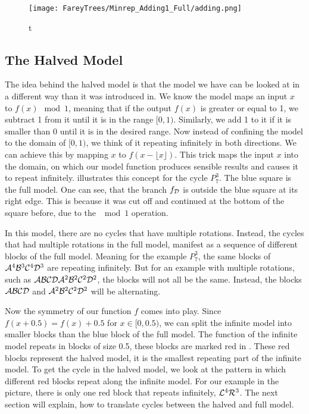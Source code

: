\begin{figure}
	\centering
	\texttt{[image: FareyTrees/Minrep\_Adding1\_Full/adding.png]}
	\caption{t}
	\label{fig:tree.adding1.hor.full}
\end{figure}

\subsection{The Halved Model}

The idea behind the halved model is that the model we have can be looked at in a different way than it was introduced in.
We know the model maps an input $x$ to $f(x) \mod 1$, meaning that if the output $f(x)$ is greater or equal to 1, we subtract 1 from it until it is in the range $[0, 1)$.
Similarly, we add 1 to it if it is smaller than 0 until it is in the desired range.
Now instead of confining the model to the domain of $[0, 1)$, we think of it repeating infinitely in both directions.
We can achieve this by mapping $x$ to $f(x - \lfloor x \rfloor)$.
This trick maps the input $x$ into the domain, on which our model function produces sensible results and causes it to repeat infinitely.
 illustrates this concept for the cycle $P_7^3$.
The blue square is the full model.
One can see, that the branch $f_{\mathcal{D}}$ is outside the blue square at its right edge.
This is because it was cut off and continued at the bottom of the square before, due to the $\mod 1$ operation.


In this model, there are no cycles that have multiple rotations.
Instead, the cycles that had multiple rotations in the full model, manifest as a sequence of different blocks of the full model.
Meaning for the example $P_7^3$, the same blocks of $\mathcal{A}^4\mathcal{B}^3\mathcal{C}^4\mathcal{D}^3$ are repeating infinitely.
But for an example with multiple rotations, such as $\mathcal{A}\mathcal{B}\mathcal{C}\mathcal{D}\mathcal{A}^2\mathcal{B}^2\mathcal{C}^2\mathcal{D}^2$, the blocks will not all be the same.
Instead, the blocks $\mathcal{A}\mathcal{B}\mathcal{C}\mathcal{D}$ and $\mathcal{A}^2\mathcal{B}^2\mathcal{C}^2\mathcal{D}^2$ will be alternating.

Now the symmetry of our function $f$ comes into play.
Since $f(x + 0.5) = f(x) + 0.5$ for $x \in [0, 0.5)$, we can split the infinite model into smaller blocks than the blue block of the full model.
The function of the infinite model repeats in blocks of size 0.5, these blocks are marked red in .
These red blocks represent the halved model, it is the smallest repeating part of the infinite model.
To get the cycle in the halved model, we look at the pattern in which different red blocks repeat along the infinite model.
For our example in the picture, there is only one red block that repeats infinitely, $\mathcal{L}^4\mathcal{R}^3$.
The next section will explain, how to translate cycles between the halved and full model.


